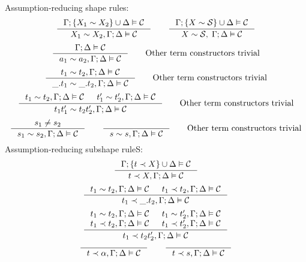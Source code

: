 \documentclass[english, mgr]{iithesis}
\begin{document}
\begin{appendices}
$${}
$$
Assumption-reducing shape rules:
$$
\inference{
  \cEnv ; \{\termv_1 \csheq \termv_2\} \cup \icEnv \vDash \sconstr
}{
  \termv_1 \csheq \termv_2, \cEnv ; \icEnv \vDash \sconstr
}
\qquad
\inference{
  \cEnv ; \{\termv \csheq \shape\} \cup \icEnv \vDash \sconstr
}{
  \termv \csheq \shape,\; \cEnv ; \icEnv \vDash \sconstr
}
$$
$$
\inference{
  \cEnv ; \icEnv \vDash \sconstr
}{
  \atomv_1 \csheq \atomv_2, \cEnv ; \icEnv \vDash \sconstr
}
\qquad
\text{Other term constructors trivial}
$$
$$
\inference{
  \term_1 \csheq \term_2, \cEnv ; \icEnv \vDash \sconstr
}{
  \shbind\term_1 \csheq \shbind\term_2, \cEnv ; \icEnv \vDash \sconstr
}
\qquad
\text{Other term constructors trivial}
$$
$$
\inference{
  \term_1  \csheq \term_2 , \cEnv ; \icEnv \vDash \sconstr
  &
  \term_1' \csheq \term_2', \cEnv ; \icEnv \vDash \sconstr
}{
  \term_1 \term_1' \csheq \term_2\term_2', \cEnv ; \icEnv \vDash \sconstr
}
\qquad
\text{Other term constructors trivial}
$$
$$
\inference{
  \symb_1 \neq \symb_2
}{
  \symb_1 \csheq \symb_2 , \cEnv ; \icEnv \vDash \sconstr
}
\qquad
\inference{
}{
  \symb \csheq \symb , \cEnv ; \icEnv \vDash \sconstr
}
\qquad
\text{Other term constructors trivial}
$$
Assumption-reducing subshape ruleS:
$$
\inference{
  \cEnv ; \{\term \cshlt \termv\} \cup \icEnv \vDash \sconstr
}{
  \term \cshlt \termv, \cEnv ; \icEnv \vDash \sconstr
}
$$
$$
\inference{
  \term_1 \csheq \term_2, \cEnv ; \icEnv \vDash \sconstr
  &
  \term_1 \cshlt \term_2, \cEnv ; \icEnv \vDash \sconstr
}{
  \term_1 \cshlt \shbind \term_2, \cEnv ; \icEnv \vDash \sconstr
}
$$
$$
\inference{
  \term_1 \csheq \term_2, \cEnv ; \icEnv \vDash \sconstr
  &
  \term_1 \csheq \term_2', \cEnv ; \icEnv \vDash \sconstr
  \\
  \term_1 \cshlt \term_2, \cEnv ; \icEnv \vDash \sconstr
  &
  \term_1 \cshlt \term_2', \cEnv ; \icEnv \vDash \sconstr
}{
  \term_1 \cshlt \term_2 \term_2', \cEnv ; \icEnv \vDash \sconstr
}
$$
$$
\inference{
}{
  \term \cshlt \atomexp, \cEnv ; \icEnv \vDash \sconstr
}
\qquad
\inference{
}{
  \term \cshlt \symb, \cEnv ; \icEnv \vDash \sconstr
}
$$

\end{appendices}
\end{document}
